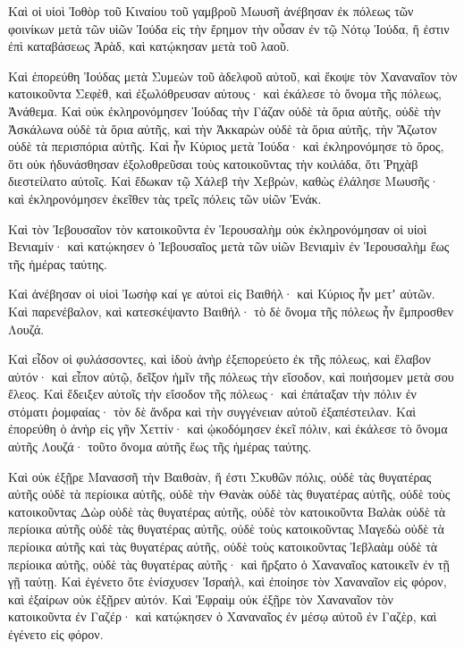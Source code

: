 {\par }{\PP {}Καὶ οἱ υἱοὶ Ἰοθὸρ τοῦ Κιναίου τοῦ γαμβροῦ Μωυσῆ ἀνέβησαν ἐκ πόλεως τῶν φοινίκων μετὰ τῶν υἱῶν Ἰούδα εἰς τὴν ἔρημον τὴν οὖσαν ἐν τῷ Νότῳ Ἰούδα, ἥ ἐστιν ἐπὶ καταβάσεως Ἀρὰδ, καὶ κατῴκησαν μετὰ τοῦ λαοῦ.
\par }{\PP {}Καὶ ἐπορεύθη Ἰούδας μετὰ Συμεὼν τοῦ ἀδελφοῦ αὐτοῦ, καὶ ἔκοψε τὸν Χαναναῖον τὸν κατοικοῦντα Σεφὲθ, καὶ ἐξωλόθρευσαν αὐτους· καὶ ἐκάλεσε τὸ ὄνομα τῆς πόλεως, Ἀνάθεμα.
Καὶ οὐκ ἐκληρονόμησεν Ἰούδας τὴν Γάζαν οὐδὲ τὰ ὅρια αὐτῆς, οὐδὲ τὴν Ἀσκάλωνα οὐδὲ τὰ ὅρια αὐτῆς, καὶ τὴν Ἀκκαρὼν οὐδὲ τὰ ὅρια αὐτῆς, τὴν Ἄζωτον οὐδὲ τὰ περισπόρια αὐτῆς.
Καὶ ἦν Κύριος μετὰ Ἰούδα· καὶ ἐκληρονόμησε τὸ ὄρος, ὅτι οὐκ ἠδυνάσθησαν ἐξολοθρεῦσαι τοὺς κατοικοῦντας τὴν κοιλάδα, ὅτι Ῥηχὰβ διεστείλατο αὐτοῖς.
Καὶ ἔδωκαν τῷ Χάλεβ τὴν Χεβρὼν, καθὼς ἐλάλησε Μωυσῆς· καὶ ἐκληρονόμησεν ἐκεῖθεν τὰς τρεῖς πόλεις τῶν υἱῶν Ἐνάκ.
\par }{\PP {}Καὶ τὸν Ἰεβουσαῖον τὸν κατοικοῦντα ἐν Ἱερουσαλὴμ οὐκ ἐκληρονόμησαν οἱ υἱοὶ Βενιαμίν· καὶ κατῴκησεν ὁ Ἰεβουσαῖος μετὰ τῶν υἱῶν Βενιαμὶν ἐν Ἱερουσαλὴμ ἕως τῆς ἡμέρας ταύτης.
\par }{\PP {}Καὶ ἀνέβησαν οἱ υἱοὶ Ἰωσὴφ καί γε αὐτοὶ εἰς Βαιθήλ· καὶ Κύριος ἦν μετʼ αὐτῶν.
Καὶ παρενέβαλον, καὶ κατεσκέψαντο Βαιθήλ· τὸ δὲ ὄνομα τῆς πόλεως ἦν ἔμπροσθεν Λουζά.
\par }{\PP {}Καὶ εἶδον οἱ φυλάσσοντες, καὶ ἰδοὺ ἀνὴρ ἐξεπορεύετο ἐκ τῆς πόλεως, καὶ ἔλαβον αὐτόν· καὶ εἶπον αὐτῷ, δεῖξον ἡμῖν τῆς πόλεως τὴν εἴσοδον, καὶ ποιήσομεν μετὰ σου ἔλεος.
Καὶ ἔδειξεν αὐτοῖς τὴν εἴσοδον τῆς πόλεως· καὶ ἐπάταξαν τὴν πόλιν ἐν στόματι ῥομφαίας· τὸν δὲ ἄνδρα καὶ τὴν συγγένειαν αὐτοῦ ἐξαπέστειλαν.
Καὶ ἐπορεύθη ὁ ἀνὴρ εἰς γῆν Χεττίν· καὶ ᾠκοδόμησεν ἐκεῖ πόλιν, καὶ ἐκάλεσε τὸ ὄνομα αὐτῆς Λουζά· τοῦτο ὄνομα αὐτῆς ἕως τῆς ἡμέρας ταύτης.
\par }{\PP {}Καὶ οὐκ ἐξῇρε Μανασσῆ τὴν Βαιθσὰν, ἥ ἐστι Σκυθῶν πόλις, οὐδὲ τὰς θυγατέρας αὐτῆς οὐδὲ τὰ περίοικα αὐτῆς, οὐδὲ τὴν Θανὰκ οὐδὲ τὰς θυγατέρας αὐτῆς, οὐδὲ τοὺς κατοικοῦντας Δὼρ οὐδὲ τὰς θυγατέρας αὐτῆς, οὐδὲ τὸν κατοικοῦντα Βαλὰκ οὐδὲ τὰ περίοικα αὐτῆς οὐδὲ τὰς θυγατέρας αὐτῆς, οὐδὲ τοὺς κατοικοῦντας Μαγεδὼ οὐδὲ τὰ περίοικα αὐτῆς καὶ τὰς θυγατέρας αὐτῆς, οὐδὲ τοὺς κατοικοῦντας Ἰεβλαὰμ οὐδὲ τὰ περίοικα αὐτῆς, οὐδὲ τὰς θυγατέρας αὐτῆς· καὶ ἤρξατο ὁ Χαναναῖος κατοικεῖν ἐν τῇ γῇ ταύτῃ.
Καὶ ἐγένετο ὅτε ἐνίσχυσεν Ἰσραὴλ, καὶ ἐποίησε τὸν Χαναναῖον εἰς φόρον, καὶ ἐξαίρων οὐκ ἐξῇρεν αὐτόν.
Καὶ Ἐφραὶμ οὐκ ἐξῇρε τὸν Χαναναῖον τὸν κατοικοῦντα ἐν Γαζέρ· καὶ κατῴκησεν ὁ Χαναναῖος ἐν μέσῳ αὐτοῦ ἐν Γαζὲρ, καὶ ἐγένετο εἰς φόρον.
}
